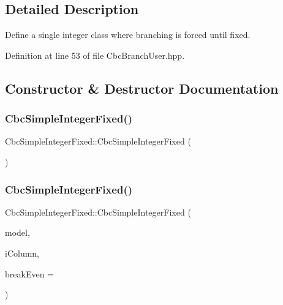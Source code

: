 \subsection{Detailed Description}
Define a single integer class where branching is forced until fixed. 

Definition at line 53 of file Cbc\+Branch\+User.\+hpp.



\subsection{Constructor \& Destructor Documentation}
\mbox{\label{classCbcSimpleIntegerFixed_adaf8dcc71fcace1dc3bf84f8e638e048}} 
\subsubsection{\texorpdfstring{Cbc\+Simple\+Integer\+Fixed()}{CbcSimpleIntegerFixed()}\hspace{0.1cm}{\footnotesize\ttfamily [1/4]}}
{\footnotesize\ttfamily Cbc\+Simple\+Integer\+Fixed\+::\+Cbc\+Simple\+Integer\+Fixed (\begin{DoxyParamCaption}{ }\end{DoxyParamCaption})}

\mbox{\label{classCbcSimpleIntegerFixed_a94a2a9c4b78e24d5e8b06f65c9bc1d7d}} 
\subsubsection{\texorpdfstring{Cbc\+Simple\+Integer\+Fixed()}{CbcSimpleIntegerFixed()}\hspace{0.1cm}{\footnotesize\ttfamily [2/4]}}
{\footnotesize\ttfamily Cbc\+Simple\+Integer\+Fixed\+::\+Cbc\+Simple\+Integer\+Fixed (\begin{DoxyParamCaption}\item[{Cbc\+Model $\ast$}]{model,  }\item[{int}]{i\+Column,  }\item[{double}]{break\+Even = {} }\end{DoxyParamCaption})}


